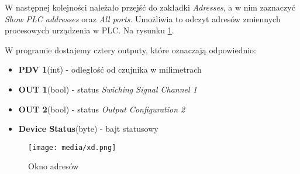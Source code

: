 \documentclass{article}
\begin{document}
\newpage

W następnej kolejności należało przejść do zakładki \textit{Adresses}, a w nim zaznaczyć \textit{Show PLC addresses} oraz \textit{All ports}.
Umożliwia to odczyt adresów zmiennych procesowych urządzenia w PLC. Na rysunku \ref{fig:adresy}.

W programie dostajemy cztery outputy, które oznaczają odpowiednio: 
\begin{itemize}
    \item \textbf{PDV 1}(int) - odległość od czujnika w milimetrach
    \item \textbf{OUT 1}(bool) - status \textit{Swiching Signal Channel 1}
    \item \textbf{OUT 2}(bool) - status \textit{Output Configuration 2}
    \item \textbf{Device Status}(byte) - bajt statusowy
\end{itemize}


\begin{figure}[H]
    \centering
    \texttt{[image: media/xd.png]}
    \caption{Okno adresów}
    \label{fig:adresy}
\end{figure}
\end{document}
